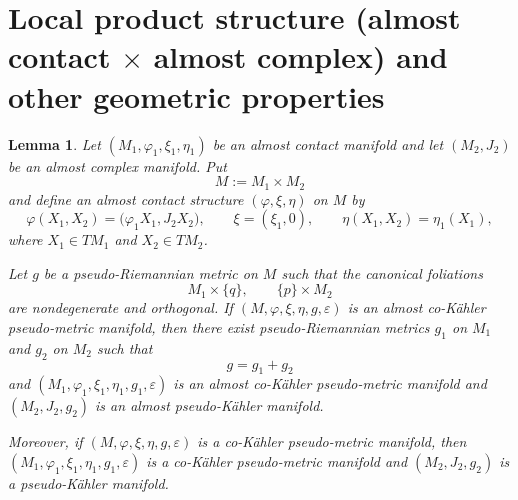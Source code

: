 \documentclass[12pt,a4paper,final]{amsart}
\numberwithin{equation}{section}
\newtheorem{lm}[tw]{Lemma}
\theoremstyle{df}
\newcommand{\eps}{\varepsilon}
\begin{document}
\section{Local product structure (almost contact $\times$ almost complex) and other geometric properties}

\begin{lm}\label{lm::productsplit::acx}
Let $(M_1,\varphi_1,\xi_1,\eta_1)$ be an almost contact manifold and let
$(M_2,J_2)$ be an almost complex manifold. Put
$$
M:=M_1\times M_2
$$
and define an almost contact structure $(\varphi,\xi,\eta)$ on $M$ by
$$
\varphi(X_1,X_2)=\bigl(\varphi_1X_1,J_2X_2\bigr),\qquad
\xi=(\xi_1,0),\qquad
\eta(X_1,X_2)=\eta_1(X_1),
$$
where $X_1\in TM_1$ and $X_2\in TM_2$.

Let $g$ be a pseudo-Riemannian metric on $M$ such that the canonical foliations
$$
M_1\times\{q\},\qquad \{p\}\times M_2
$$
are nondegenerate and orthogonal.
If $(M,\varphi,\xi,\eta,g,\eps)$ is an almost co-K\"ahler pseudo-metric
manifold, then there exist pseudo-Riemannian metrics $g_1$ on $M_1$ and $g_2$ on $M_2$
such that
$$
g=g_1+g_2
$$
and
$(M_1,\varphi_1,\xi_1,\eta_1,g_1,\eps)$
is an almost co-K\"ahler pseudo-metric manifold and
$(M_2,J_2,g_2)$
is an almost pseudo-K\"ahler manifold.

Moreover, if $(M,\varphi,\xi,\eta,g,\eps)$ is a co-K\"ahler pseudo-metric
manifold, then $(M_1,\varphi_1,\xi_1,\eta_1,g_1,\eps)$
is a co-K\"ahler pseudo-metric manifold and
$(M_2,J_2,g_2)$
is a pseudo-K\"ahler manifold.
\end{lm}
\end{document}
